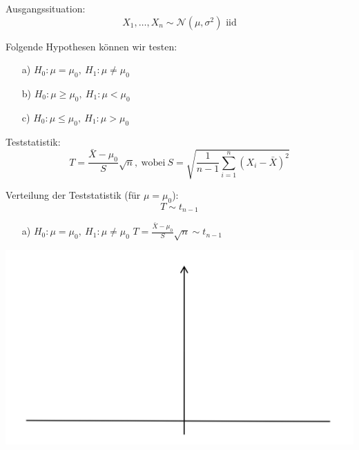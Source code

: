\documentclass[t,11pt,aspectratio=169]{beamer}
\begin{document}
\begin{frame}
Ausgangssituation:
$$ X_1,\dots,X_n\sim \mathcal{N}(\mu,\sigma^2)\text{~iid} $$
\pause

Folgende Hypothesen können wir testen:
\begin{itemize}
\item[a)] $H_0:\mu=\mu_0,~H_1:\mu\neq\mu_0$
\item[b)] $H_0:\mu\geq\mu_0,~H_1:\mu< \mu_0$
\item[c)] $H_0:\mu\leq\mu_0,~H_1:\mu > \mu_0$
\end{itemize}
\vspace{0.4cm}
\pause

Teststatistik:
$$ T=\frac{\bar{X}-\mu_0}{S}\sqrt{n},~\text{wobei}~S=\sqrt{\frac{1}{n-1}\sum_{i=1}^{n}(X_i-\bar{X})^2} $$
\pause

Verteilung der Teststatistik (für $\mu=\mu_0$):
$$T\sim t_{n-1}$$
\end{frame}

\begin{frame}
\begin{itemize}
\item[a)] $H_0:\mu=\mu_0,~H_1:\mu\neq\mu_0$ \hfill $T=\frac{\bar{X}-\mu_0}{S}\sqrt{n}\sim t_{n-1}$ \hfill
\end{itemize}
\begin{center}
\includegraphics[scale=0.4]{1.png}
\end{center}
\end{frame}
\end{document}
